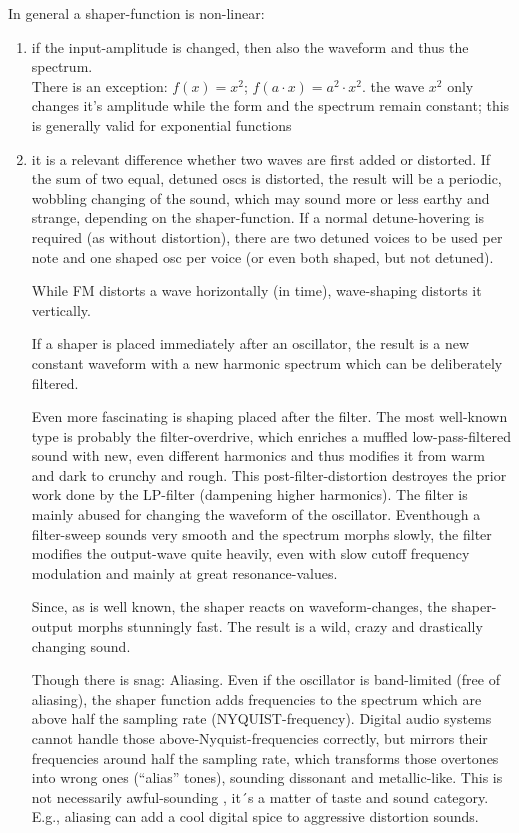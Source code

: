 In general a shaper-function is non-linear:
\begin{enumerate}
	\item if the input-amplitude is changed, then also the waveform and thus the spectrum.\\
	There is an exception: $f(x)=x^2$; $f(a \cdot x) = a^2 \cdot x^2$. the wave $x^2$ only changes it's amplitude while the form and the spectrum remain constant; this is generally valid for exponential functions
	\item it is a relevant difference whether two waves are first added or distorted. If the sum of two equal, detuned oscs is distorted, the result will be a periodic, wobbling changing of the sound, which may sound more or less earthy and strange, depending on the shaper-function. If a normal detune-hovering is required (as without distortion), there are two detuned voices to be used per note and one shaped osc per voice (or even both shaped, but not detuned).
	
	While FM distorts a wave horizontally (in time), wave-shaping distorts it vertically.
	
	If a shaper is placed immediately after an oscillator, the result is a new constant waveform with a new harmonic spectrum which can be deliberately filtered.
	
	Even more fascinating is shaping placed after the filter. The most well-known type is probably the filter-overdrive, which enriches a muffled low-pass-filtered sound with new, even different harmonics and thus modifies it from warm and dark to crunchy and rough. This post-filter-distortion destroyes the prior work done by the LP-filter (dampening higher harmonics). The filter is mainly abused for changing the waveform of the oscillator. Eventhough a filter-sweep sounds very smooth and the spectrum morphs slowly, the filter modifies the output-wave quite heavily, even with slow cutoff frequency modulation and mainly at great resonance-values.
	
	Since, as is well known, the shaper reacts on waveform-changes, the shaper-output morphs stunningly fast. The result is a wild, crazy and drastically changing sound.
	
	Though there is snag: Aliasing. Even if the oscillator is band-limited (free of aliasing), the shaper function adds frequencies to the spectrum which are above half the sampling rate (NYQUIST-frequency). Digital audio systems cannot handle those above-Nyquist-frequencies correctly, but mirrors their frequencies around half the sampling rate, which transforms those overtones into wrong ones (``alias'' tones), sounding dissonant and metallic-like. This is not necessarily awful-sounding , it´s a matter of taste and sound category. E.g., aliasing can add a cool digital spice to aggressive distortion sounds.
\end{enumerate}

